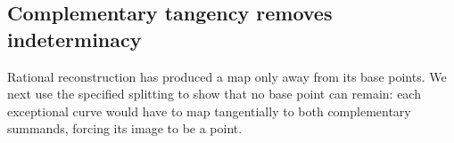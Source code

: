 \subsection{Complementary tangency removes indeterminacy}

Rational reconstruction has produced a map only away from its base
points. We next use the specified splitting to show that no base point
can remain: each exceptional curve would have to map tangentially to
both complementary summands, forcing its image to be a point.


